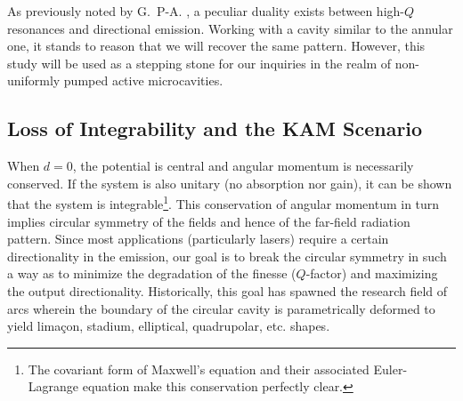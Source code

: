 As previously noted by G.~P-A. \cite{GAP2013}, a peculiar
duality exists between high-$Q$ resonances and directional emission.
Working with a cavity similar to the annular one, it stands to reason
that we will recover the same pattern. However, this study will be used
as a stepping stone for our inquiries in the realm of non-uniformly
pumped active microcavities. 

\subsection{Loss of Integrability and the KAM Scenario}
When $d=0$, the potential is central and angular momentum is 
necessarily conserved. If the system is also unitary
(no absorption nor gain), it can be shown that the system is
integrable\footnote{The covariant form of Maxwell's equation and their
associated Euler-Lagrange equation make this conservation perfectly clear.}. 
This conservation of angular momentum in turn
implies circular symmetry of the fields and hence of the 
far-field radiation pattern. Since most applications (particularly lasers)
require a certain directionality in the emission, our goal is to break 
the circular symmetry in such a way as to minimize the degradation of the
finesse ($Q$-factor) and maximizing the output directionality. Historically, 
this goal has spawned the research field of \glspl{arc} wherein the boundary
of the circular cavity is parametrically deformed to yield limaçon, stadium, 
elliptical, quadrupolar, etc. shapes. 

